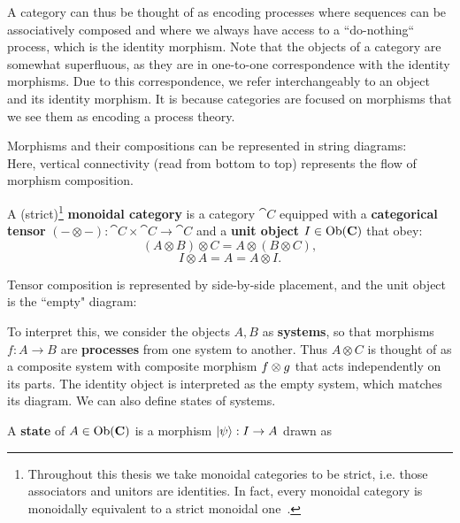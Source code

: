 A category can thus be thought of as encoding processes where sequences can be associatively composed  and where we always have access to a ``do-nothing`` process, which is the identity morphism. Note that the objects of a category are somewhat superfluous, as they are in one-to-one correspondence with the identity morphisms. Due to this correspondence, we refer interchangeably to an object and its identity morphism. It is because categories are focused on morphisms that we see them as encoding a process theory.

Morphisms and their compositions can be represented in string diagrams:
\begin{equation}
\label{eq:composition}

\end{equation}
\noindent Here, vertical connectivity (read from bottom to top) represents the flow of morphism composition.

\begin{defn}
A (strict)\footnote{Throughout this thesis we take monoidal categories to be strict, i.e. those associators and unitors are identities.  In fact, every monoidal category is monoidally equivalent to a strict monoidal one~\cite{joyal1993braided}.} \textbf{monoidal category} is a category $\cat{C}$ equipped with a \textbf{categorical tensor} $(-\otimes-):\cat{C}\times\cat{C}\to\cat{C}$ and a \textbf{unit object} $I\in\mbox{Ob}(\mathbf{C})$ that obey:
\begin{equation}
(A\otimes B)\otimes C = A\otimes(B\otimes C),
\end{equation}
\begin{equation}
I\otimes A = A = A\otimes I.
\end{equation}
\end{defn}

Tensor composition is represented by side-by-side placement, and the unit object is the ``empty" diagram:
\begin{equation}
\label{eq:tensor}

\end{equation}

To interpret this, we consider the objects $A,B$ as \textbf{systems}, so that morphisms $f:A\to B$ are \textbf{processes} from one system to another. Thus $A\otimes C$ is thought of as a composite system with composite morphism $f \otimes g$ that acts independently on its parts. The identity object is interpreted as the empty system, which matches its diagram. We can also define states of systems.

\begin{defn}
\label{defn:state}
A \textbf{state} of $A\in\mbox{Ob}(\mathbf{C})$ is a morphism $| \psi \rangle:I\to A$ drawn as
\begin{equation}
\label{eq:state}

\end{equation}
\end{defn}

